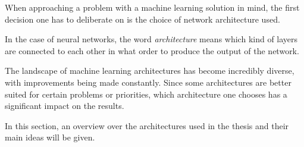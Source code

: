 When approaching a problem with a machine learning solution in mind, the first decision one has to deliberate on is the choice of network architecture used. 

In the case of neural networks, the word \emph{architecture} means which kind of layers are connected to each other in what order to produce the output of the network.

The landscape of machine learning architectures has become incredibly diverse, with improvements being made constantly.
Since some architectures are better suited for certain problems or priorities, which architecture one chooses has a significant impact on the results.

In this section, an overview over the architectures used in the thesis and their main ideas will be given.